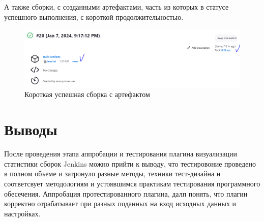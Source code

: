А также сборки, с созданными артефактами, часть из которых в статусе успешного выполнения, с короткой продолжительностью.
 
 \begin{figure}[ht!] 
	\center
	\includegraphics [scale=0.47] {my_folder/images//artifactBuild}
	\caption{Короткая успешная сборка с артефактом} 
	\label{fig:artifactBuild}  
\end{figure}
 
 
\section{Выводы} \label{ch4:sec3}

После проведения этапа аппробации и тестирования плагина визуализации статистики сборок Jenkins можно прийти к выводу, что тестировоние проведено в полном объеме и затронуло разные методы, техники тест-дизайна и соответсвует методологиям и устоявшимся практикам тестирования программного обесечения. Аппробация протестированного плагина, далп понять, что плагин корректно отрабатывает при разных поданных на вход исходных данных и настройках.






%
%

%
%






